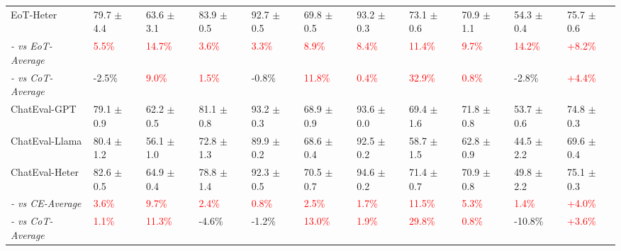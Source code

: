 \begin{table*}[tb!]
{\begin{tabular}{l|lllllllll|l}
EoT-Heter              &  79.7  $\pm$ 4.4   &    \cellcolor{green!25}63.6 $\pm$ 3.1     &    \cellcolor{green!75}83.9 $\pm$ 0.5           &  92.7 $\pm$ 0.5             &     \cellcolor{green!25}69.8 $\pm$ 0.5      & 93.2 $\pm$ 0.3      &   73.1 $\pm$ 0.6   &    70.9 $\pm$ 1.1      &    54.3 $\pm$ 0.4   &       \cellcolor{green!25}75.7 $\pm$ 0.6 \\
\textit{- vs EoT-Average} &\textcolor{red}{5.5\%} & \textcolor{red}{14.7\%} & \textcolor{red}{3.6\%} & \textcolor{red}{3.3\%} & \textcolor{red}{8.9\%} & \textcolor{red}{8.4\%} & \textcolor{red}{11.4\%} & \textcolor{red}{9.7\%} & \textcolor{red}{14.2\%} & \textcolor{red}{+8.2\%} \\
\textit{- vs CoT-Average} &-2.5\%&\textcolor{red}{9.0\%}&\textcolor{red}{1.5\%}&-0.8\%&\textcolor{red}{11.8\%}&\textcolor{red}{0.4\%}&\textcolor{red}{32.9\%}&\textcolor{red}{0.8\%}&-2.8\%&\textcolor{red}{+4.4\%}\\
\hline
ChatEval-GPT            &  79.1 $\pm$ 0.9 &  62.2 $\pm$ 0.5 &  \cellcolor{green!25}81.1 $\pm$ 0.8 &  \cellcolor{green!25}93.2 $\pm$ 0.3 &  68.9 $\pm$ 0.9 & 93.6 $\pm$ 0.0 &  69.4 $\pm$ 1.6 &  \cellcolor{green!25}71.8 $\pm$ 0.8 &  \cellcolor{green!25}53.7 $\pm$ 0.6 & 74.8 $\pm$ 0.3 \\
ChatEval-Llama          &  80.4 $\pm$ 1.2 &  56.1 $\pm$ 1.0 &  72.8 $\pm$ 1.3 &  89.9 $\pm$ 0.2 &  68.6 $\pm$ 0.4 &  92.5 $\pm$ 0.2 &  58.7 $\pm$ 1.5 & 62.8 $\pm$ 0.9 &  44.5 $\pm$ 2.2  & 69.6 $\pm$ 0.4 \\
ChatEval-Heter          & \cellcolor{green!25}82.6 $\pm$ 0.5 & \cellcolor{green!25}64.9 $\pm$ 0.4    & 78.8 $\pm$ 1.4          & 92.3 $\pm$ 0.5          & \cellcolor{green!75}70.5 $\pm$ 0.7      & \cellcolor{green!25}94.6 $\pm$ 0.2  & \cellcolor{green!25}71.4 $\pm$ 0.7 & 70.9 $\pm$ 0.8      & 49.8 $\pm$ 2.2  & \cellcolor{green!25}75.1 $\pm$ 0.3 \\
\textit{- vs CE-Average} &\textcolor{red}{3.6\%} & \textcolor{red}{9.7\%} & \textcolor{red}{2.4\%} & \textcolor{red}{0.8\%} & \textcolor{red}{2.5\%} & \textcolor{red}{1.7\%} & \textcolor{red}{11.5\%} & \textcolor{red}{5.3\%} & \textcolor{red}{1.4\%} & \textcolor{red}{+4.0\%} \\
\textit{- vs CoT-Average} &\textcolor{red}{1.1\%}&\textcolor{red}{11.3\%}&-4.6\%&-1.2\%&\textcolor{red}{13.0\%}&\textcolor{red}{1.9\%}&\textcolor{red}{29.8\%}&\textcolor{red}{0.8\%}&-10.8\%&\textcolor{red}{+3.6\%} \\


\end{tabular}}
\end{table*}
